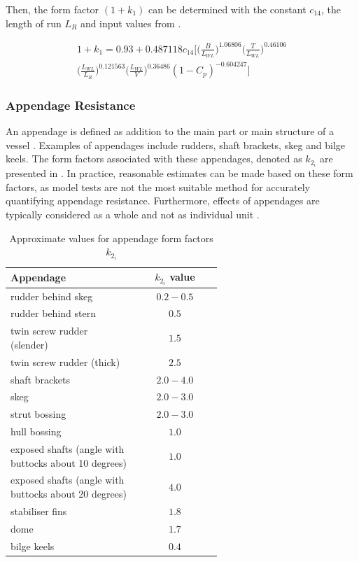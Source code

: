 Then, the form factor $(1+k_1)$ can be determined with the constant $c_{14}$, the length of run $L_R$ and input values from .

\begin{multline}\label{eqn:1+k1}
    1+k_1 = 0.93 + 0.487118c_{14}\Biggl[ \Biggl(\frac{B}{L_{WL}}\Biggr)^{1.06806}  \Biggl(\frac{T}{L_{WL}}\Biggr)^{0.46106} \\ 
    \Biggl(\frac{L_{WL}}{L_R}\Biggr)^{0.121563} \Biggl(\frac{L_{WL}}{V}\Biggr)^{0.36486} (1-C_p)^{-0.604247} \Biggr] 
\end{multline}

\subsubsection*{Appendage Resistance}

An appendage is defined as addition to the main part or main structure of a vessel . Examples of appendages include rudders, shaft brackets, skeg and bilge keels. The form factors associated with these appendages, denoted as $k_{2_i}$ are presented in . In practice, reasonable estimates can be made based on these form factors, as model tests are not the most suitable method for accurately quantifying appendage resistance. Furthermore, effects of appendages are typically considered as a whole and not as individual unit .\\

\begin{table}[ht]
    \footnotesize
    \centering
    {\begin{tabular}{ p{0.6\linewidth} c}
    \hline
    Appendage & $k_{2_i}$ value \\
    \hline
    rudder behind skeg & $0.2-0.5$ \\
    rudder behind stern & $0.5$ \\
    twin screw rudder (slender) & $1.5$ \\
    twin screw rudder (thick) & $2.5$ \\
    shaft brackets & $2.0-4.0$ \\
    skeg & $2.0-3.0$ \\
    strut bossing & $2.0-3.0$ \\
    hull bossing & $1.0$ \\
    exposed shafts (angle with buttocks about 10 degrees) & $1.0$ \\
    exposed shafts (angle with buttocks about 20 degrees) & $4.0$ \\
    stabiliser fins & $1.8$ \\
    dome & $1.7$ \\
    bilge keels & $0.4$ \\ 
    \hline
    \end{tabular}}
\caption{Approximate values for appendage form factors $k_{2_i}$}\label{tbl:k2i_values}
\end{table}

